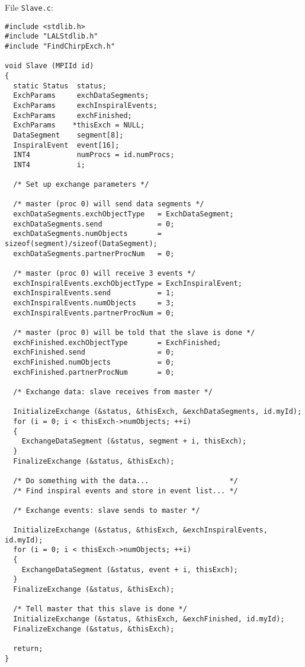 \documentclass{article}
\begin{document}
File \verb+Slave.c+:
\begin{verbatim}
#include <stdlib.h>
#include "LALStdlib.h"
#include "FindChirpExch.h"

void Slave (MPIId id)
{
  static Status  status;
  ExchParams     exchDataSegments;
  ExchParams     exchInspiralEvents;
  ExchParams     exchFinished;
  ExchParams    *thisExch = NULL;
  DataSegment    segment[8];
  InspiralEvent  event[16];
  INT4           numProcs = id.numProcs;
  INT4           i;

  /* Set up exchange parameters */

  /* master (proc 0) will send data segments */
  exchDataSegments.exchObjectType   = ExchDataSegment;
  exchDataSegments.send             = 0;
  exchDataSegments.numObjects       = sizeof(segment)/sizeof(DataSegment);
  exchDataSegments.partnerProcNum   = 0;

  /* master (proc 0) will receive 3 events */
  exchInspiralEvents.exchObjectType = ExchInspiralEvent;
  exchInspiralEvents.send           = 1;
  exchInspiralEvents.numObjects     = 3;
  exchInspiralEvents.partnerProcNum = 0;

  /* master (proc 0) will be told that the slave is done */
  exchFinished.exchObjectType       = ExchFinished;
  exchFinished.send                 = 0;
  exchFinished.numObjects           = 0;
  exchFinished.partnerProcNum       = 0;

  /* Exchange data: slave receives from master */

  InitializeExchange (&status, &thisExch, &exchDataSegments, id.myId);
  for (i = 0; i < thisExch->numObjects; ++i)
  {
    ExchangeDataSegment (&status, segment + i, thisExch);
  }
  FinalizeExchange (&status, &thisExch);

  /* Do something with the data...                   */
  /* Find inspiral events and store in event list... */

  /* Exchange events: slave sends to master */

  InitializeExchange (&status, &thisExch, &exchInspiralEvents, id.myId);
  for (i = 0; i < thisExch->numObjects; ++i)
  {
    ExchangeDataSegment (&status, event + i, thisExch);
  }
  FinalizeExchange (&status, &thisExch);

  /* Tell master that this slave is done */
  InitializeExchange (&status, &thisExch, &exchFinished, id.myId);
  FinalizeExchange (&status, &thisExch);

  return;
}
\end{verbatim}
\end{document}
